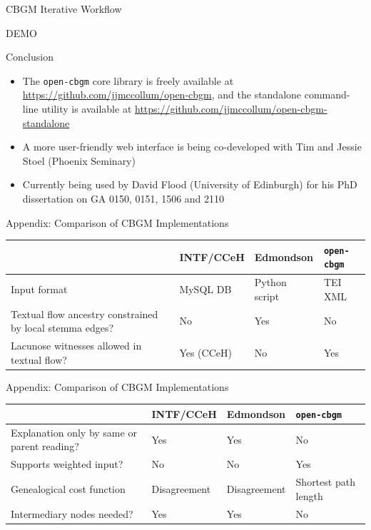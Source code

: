 \documentclass[10pt]{beamer}
\begin{document}
	\begin{frame}{CBGM Iterative Workflow}
		\begin{center}
			DEMO
		\end{center}
	\end{frame}
	\begin{frame}{Conclusion}
		\begin{itemize}
			\item The \texttt{open-cbgm} core library is freely available at \url{https://github.com/jjmccollum/open-cbgm}, and the standalone command-line utility is available at \url{https://github.com/jjmccollum/open-cbgm-standalone}
			\item A more user-friendly web interface is being co-developed with Tim and Jessie Stoel (Phoenix Seminary)
			\item Currently being used by David Flood (University of Edinburgh) for his PhD dissertation on GA 0150, 0151, 1506 and 2110
		\end{itemize}
	\end{frame}
	\begin{frame}[allowframebreaks]
		\printbibliography
	\end{frame}
	\begin{frame}{Appendix: Comparison of CBGM Implementations}
		\begin{table}
			\centering
			\begin{tabular}{p{6em}p{6em}p{6em}p{4em}}
				 & \phantom{text}\newline INTF/CCeH & \phantom{text}\newline Edmondson & \texttt{open-}\newline\texttt{cbgm}\\
				\hline
				\hline
				Input format & MySQL DB & Python script & TEI XML\\
				\hline
				Textual flow ancestry constrained by local stemma edges? & No & Yes & No\\
				\hline
				Lacunose witnesses allowed in textual flow? & Yes (CCeH) & No & Yes
			\end{tabular}
		\end{table}
	\end{frame}
	\begin{frame}{Appendix: Comparison of CBGM Implementations}
		\begin{table}
			\centering
			\begin{tabular}{p{6em}p{6em}p{6em}p{4em}}
				 & \phantom{text}\newline INTF/CCeH & \phantom{text}\newline Edmondson & \texttt{open-}\newline\texttt{cbgm}\\
				\hline
				\hline
				Explanation only by same or parent reading? & Yes & Yes & No\\
				\hline
				Supports weighted input? & No & No & Yes\\
				\hline
				Genealogical cost function & Disagreement & Disagreement & Shortest path length\\
				\hline
				Intermediary nodes needed? & Yes & Yes & No
			\end{tabular}
		\end{table}
	\end{frame}
\end{document}

